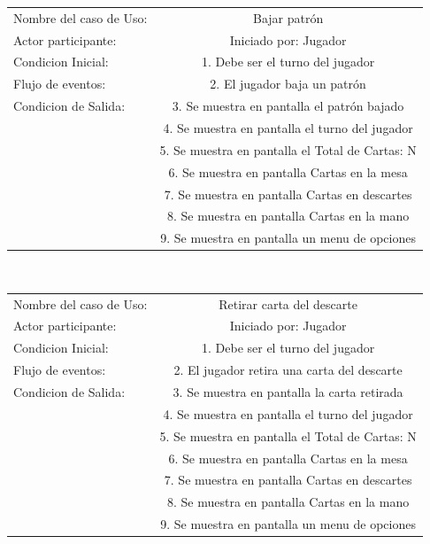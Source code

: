 \begin{center}
    \begin{tabular}{ l | c  }
        Nombre del caso de Uso: & Bajar patrón                                    \\
        Actor participante:     & Iniciado por: Jugador                           \\\hline
        Condicion Inicial:      & 1. Debe ser el turno del jugador                \\
        Flujo de eventos:       & 2. El jugador baja un patrón                    \\\hline
        Condicion de Salida:    & 3. Se muestra en pantalla el patrón bajado      \\
                                & 4. Se muestra en pantalla el turno del jugador  \\
                                & 5. Se muestra en pantalla el Total de Cartas: N \\
                                & 6. Se muestra en pantalla Cartas en la mesa     \\
                                & 7. Se muestra en pantalla Cartas en descartes   \\
                                & 8. Se muestra en pantalla Cartas en la mano     \\
                                & 9. Se muestra en pantalla un menu de opciones   \\ 
    \end{tabular} \\
\end{center}
\begin{center}
    \begin{tabular}{ l | c  }
        Nombre del caso de Uso: & Retirar carta del descarte                      \\
        Actor participante:     & Iniciado por: Jugador                           \\\hline
        Condicion Inicial:      & 1. Debe ser el turno del jugador                \\
        Flujo de eventos:       & 2. El jugador retira una carta del descarte     \\\hline
        Condicion de Salida:    & 3. Se muestra en pantalla la carta retirada     \\
                                & 4. Se muestra en pantalla el turno del jugador  \\
                                & 5. Se muestra en pantalla el Total de Cartas: N \\
                                & 6. Se muestra en pantalla Cartas en la mesa     \\
                                & 7. Se muestra en pantalla Cartas en descartes   \\
                                & 8. Se muestra en pantalla Cartas en la mano     \\
                                & 9. Se muestra en pantalla un menu de opciones   \\ 
    \end{tabular} \\
\end{center}
